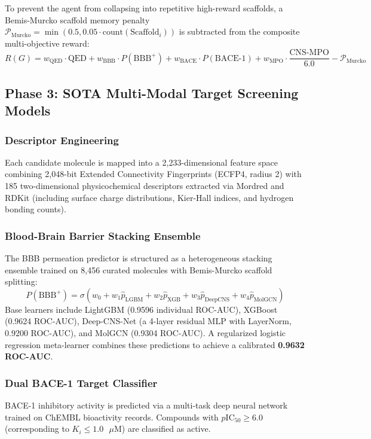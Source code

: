 \documentclass[10pt,a4paper]{article}
\begin{document}
To prevent the agent from collapsing into repetitive high-reward scaffolds, a Bemis-Murcko scaffold memory penalty $\mathcal{P}_{\text{Murcko}} = \min(0.5, 0.05 \cdot \text{count}(\text{Scaffold}_i))$ is subtracted from the composite multi-objective reward:
\begin{equation}
R(G) = w_{\text{QED}} \cdot \text{QED} + w_{\text{BBB}} \cdot P(\text{BBB}^+) + w_{\text{BACE}} \cdot P(\text{BACE-1}) + w_{\text{MPO}} \cdot \frac{\text{CNS-MPO}}{6.0} - \mathcal{P}_{\text{Murcko}}
\end{equation}

\subsection{Phase 3: SOTA Multi-Modal Target Screening Models}

\subsubsection*{Descriptor Engineering}
Each candidate molecule is mapped into a 2,233-dimensional feature space combining 2,048-bit Extended Connectivity Fingerprints (ECFP4, radius 2) with 185 two-dimensional physicochemical descriptors extracted via Mordred and RDKit (including surface charge distributions, Kier-Hall indices, and hydrogen bonding counts).

\subsubsection*{Blood-Brain Barrier Stacking Ensemble}
The BBB permeation predictor is structured as a heterogeneous stacking ensemble trained on 8,456 curated molecules with Bemis-Murcko scaffold splitting:
\begin{equation}
P(\text{BBB}^+) = \sigma\left( w_0 + w_1 \hat{p}_{\text{LGBM}} + w_2 \hat{p}_{\text{XGB}} + w_3 \hat{p}_{\text{DeepCNS}} + w_4 \hat{p}_{\text{MolGCN}} \right)
\end{equation}
Base learners include LightGBM (0.9596 individual ROC-AUC), XGBoost (0.9624 ROC-AUC), Deep-CNS-Net (a 4-layer residual MLP with LayerNorm, 0.9200 ROC-AUC), and MolGCN (0.9304 ROC-AUC). A regularized logistic regression meta-learner combines these predictions to achieve a calibrated \textbf{0.9632 ROC-AUC}.

\subsubsection*{Dual BACE-1 Target Classifier}
BACE-1 inhibitory activity is predicted via a multi-task deep neural network trained on ChEMBL bioactivity records. Compounds with $p\text{IC}_{50} \ge 6.0$ (corresponding to $K_i \le 1.0\text{ }\mu\text{M}$) are classified as active.
\end{document}
